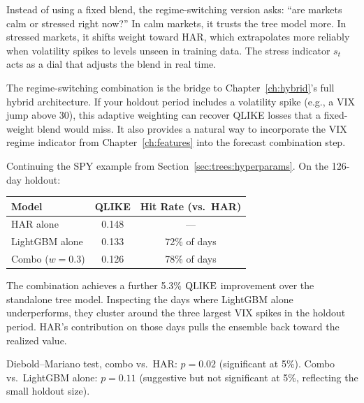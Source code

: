 \begin{intuition}
Instead of using a fixed blend, the regime-switching version asks: ``are
markets calm or stressed right now?''  In calm markets, it trusts the tree
model more.  In stressed markets, it shifts weight toward HAR, which
extrapolates more reliably when volatility spikes to levels unseen in
training data.  The stress indicator $s_t$ acts as a dial that adjusts the
blend in real time.
\end{intuition}

\begin{projectconnection}
The regime-switching combination is the bridge to Chapter~\ref{ch:hybrid}'s
full hybrid architecture.  If your holdout period includes a volatility
spike (e.g., a VIX jump above 30), this adaptive weighting can recover
QLIKE losses that a fixed-weight blend would miss.  It also provides a
natural way to incorporate the VIX regime indicator from
Chapter~\ref{ch:features} into the forecast combination step.
\end{projectconnection}

\begin{workedexample}
Continuing the SPY example from Section~\ref{sec:trees:hyperparams}.  On
the 126-day holdout:

\begin{center}
\renewcommand{\arraystretch}{1.2}
\begin{tabular}{@{}lcc@{}}
\toprule
\textbf{Model} & \textbf{QLIKE} & \textbf{Hit Rate (vs.\ HAR)} \\
\midrule
HAR alone        & 0.148 & ---  \\
LightGBM alone   & 0.133 & 72\% of days \\
Combo ($w=0.3$)  & 0.126 & 78\% of days \\
\bottomrule
\end{tabular}
\end{center}

The combination achieves a further 5.3\% $\operatorname{QLIKE}$ improvement over the
standalone tree model.  Inspecting the days where LightGBM alone
underperforms, they cluster around the three largest VIX spikes in the
holdout period.  HAR's contribution on those days pulls the ensemble back
toward the realized value.

Diebold--Mariano test, combo vs.\ HAR: $p = 0.02$ (significant at 5\%).
Combo vs.\ LightGBM alone: $p = 0.11$ (suggestive but not significant at
5\%, reflecting the small holdout size).
\end{workedexample}

